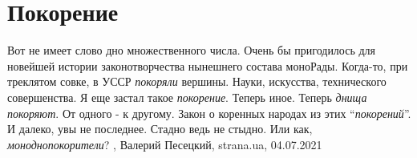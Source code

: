  
 
 
 
 
\chapter{Покорение}
\label{sec:slova.pokorenie}

Вот не имеет слово дно множественного числа. Очень бы пригодилось для новейшей
истории законотворчества нынешнего состава моноРады. Когда-то, при треклятом
совке, в УССР \emph{покоряли} вершины. Науки, искусства, технического совершенства. Я
еще застал такое \emph{покорение}. Теперь иное. Теперь \emph{днища покоряют}. От одного - к
другому. Закон о коренных народах из этих \enquote{\emph{покорений}}. И далеко, увы не
последнее. Стадно ведь не стыдно. Или как, \emph{моноднопокорители}?
, 
Валерий Песецкий, strana.ua, 04.07.2021
